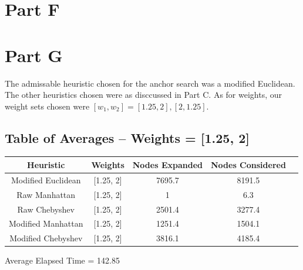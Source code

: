 \documentclass[12pt]{article}
\begin{document}
\section{Part F}


\section{Part G}
The admissable heuristic chosen for the anchor search was a modified Euclidean. The other heuristics chosen were as disccussed in Part C. As for weights, our weight sets chosen were \([w_1,w_2] = [1.25,2],[2,1.25]\).

\subsection{Table of Averages -- Weights = [1.25, 2]}
\begin{tabular}{|c|c|c|c|c|}
\hline
	Heuristic & Weights & Nodes Expanded & Nodes Considered\\
\hline
	Modified Euclidean & [1.25, 2] & 7695.7 & 8191.5\\
\hline
	Raw Manhattan & [1.25, 2] & 1 & 6.3\\
\hline
	Raw Chebyshev & [1.25, 2] & 2501.4 & 3277.4\\
\hline
	Modified Manhattan & [1.25, 2] & 1251.4 & 1504.1\\
\hline
	Modified Chebyshev & [1.25, 2] & 3816.1 & 4185.4\\
\hline
\end{tabular}
\newline
Average Elapsed Time = 142.85
\end{document}
